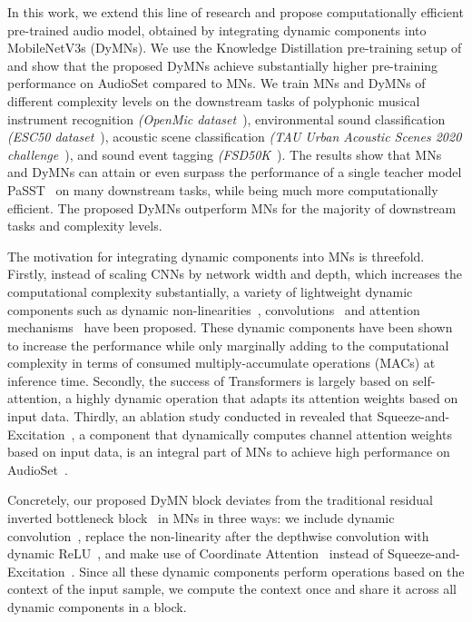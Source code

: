 \documentclass[lettersize,journal]{IEEEtran}
\begin{document}
In this work, we extend this line of research and propose computationally efficient pre-trained audio model, obtained by integrating dynamic components into MobileNetV3s (DyMNs). We use the Knowledge Distillation pre-training setup of \cite{Schmid22Efficient} and show that the proposed DyMNs achieve substantially higher pre-training performance on AudioSet compared to MNs. We train MNs and DyMNs of different complexity levels on the downstream tasks of polyphonic musical instrument recognition \textit{(OpenMic dataset}~\cite{humphrey2018openmic}), environmental sound classification \textit{(ESC50 dataset}~\cite{piczak2015esc}), acoustic scene classification \textit{(TAU Urban Acoustic Scenes 2020 challenge}~\cite{heittola2020acoustic}), and sound event tagging \textit{(FSD50K}~\cite{fonseca2021fsd50k}). The results show that MNs and DyMNs can attain or even surpass the performance of a single teacher model PaSST~\cite{Koutini21Passt} on many downstream tasks, while being much more computationally efficient. The proposed DyMNs outperform MNs for the majority of downstream tasks and complexity levels.

The motivation for integrating dynamic components into MNs is threefold. Firstly, instead of scaling CNNs by network width and depth, which increases the computational complexity substantially, a variety of lightweight dynamic components such as dynamic non-linearities~\cite{chen2020dynamic_relu, si2018dynamic}, convolutions~\cite{chen2020dynamic_conv, yang2019condconv} and attention mechanisms~\cite{Hu18Squeeze, hou2021coordinate, lee2019srm, woo2018cbam, park2018bam, misra2021triplet, cao2019gcnet} have been proposed. These dynamic components have been shown to increase the performance while only marginally adding to the computational complexity in terms of consumed multiply-accumulate operations (MACs) at inference time. Secondly, the success of Transformers is largely based on self-attention, a highly dynamic operation that adapts its attention weights based on input data. Thirdly, an ablation study conducted in \cite{Schmid22Efficient} revealed that Squeeze-and-Excitation~\cite{Hu18Squeeze}, a component that dynamically computes channel attention weights based on input data, is an integral part of MNs to achieve high performance on AudioSet~\cite{audioset2017Gemmeke}. 

Concretely, our proposed DyMN block deviates from the traditional residual inverted bottleneck block~\cite{Sandler18MobileNetsV2} in MNs in three ways: we include dynamic convolution~\cite{chen2020dynamic_conv}, replace the non-linearity after the depthwise convolution with dynamic ReLU~\cite{chen2020dynamic_relu}, and make use of Coordinate Attention~\cite{hou2021coordinate} instead of Squeeze-and-Excitation~\cite{Hu18Squeeze}. Since all these dynamic components perform operations based on the context of the input sample, we compute the context once and share it across all dynamic components in a block.
\end{document}
